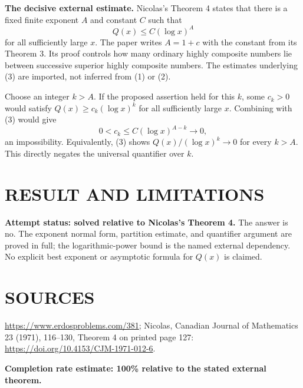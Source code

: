 \textbf{The decisive external estimate.} Nicolas's Theorem 4 states that there is a fixed finite exponent $A$ and constant $C$ such that
\[
Q(x)\leq C(\log x)^A                                      \tag{3}
\]
for all sufficiently large $x$. The paper writes $A=1+c$ with the constant from its Theorem 3. Its proof controls how many ordinary highly composite numbers lie between successive superior highly composite numbers. The estimates underlying (3) are imported, not inferred from (1) or (2).

Choose an integer $k>A$. If the proposed assertion held for this $k$, some $c_k>0$ would satisfy $Q(x)\geq c_k(\log x)^k$ for all sufficiently large $x$. Combining with (3) would give
\[
0<c_k\leq C(\log x)^{A-k}\longrightarrow0,
\]
an impossibility. Equivalently, (3) shows $Q(x)/(\log x)^k\to0$ for every $k>A$. This directly negates the universal quantifier over $k$.

\section{RESULT AND LIMITATIONS}
\textbf{Attempt status: solved relative to Nicolas's Theorem 4.} The answer is no. The exponent normal form, partition estimate, and quantifier argument are proved in full; the logarithmic-power bound is the named external dependency. No explicit best exponent or asymptotic formula for $Q(x)$ is claimed.

\section{SOURCES}
\url{https://www.erdosproblems.com/381}; Nicolas, Canadian Journal of Mathematics 23 (1971), 116--130, Theorem 4 on printed page 127: \url{https://doi.org/10.4153/CJM-1971-012-6}.

\textbf{Completion rate estimate: 100\% relative to the stated external theorem.}
